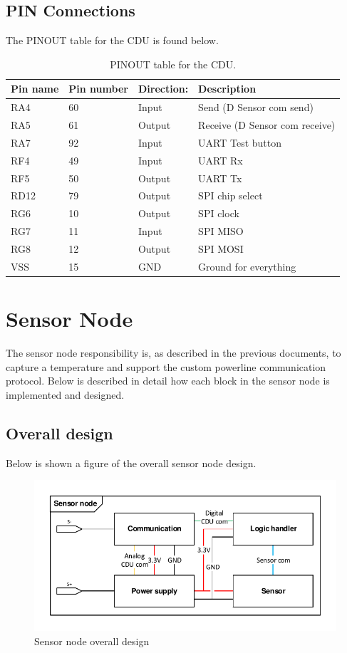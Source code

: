\subsection{PIN Connections}
The PINOUT table for the CDU is found below.
\begin{table}[H]
	\centering
    \begin{tabular}{|l|l|l|l|}
    \hline
    Pin name & Pin number & Direction: & Description \\ \hline
    RA4    & 60 & Input          & Send (D Sensor com send)            \\ \hline
    RA5    & 61 & Output          & Receive (D Sensor com receive)    \\ \hline
    RA7	   & 92 & Input			 & UART Test button   \\ \hline
    RF4		& 49 & Input		 & UART Rx \\ \hline
    RF5		& 50 & Output		 & UART Tx \\ \hline
    RD12	& 79 & Output			 & SPI chip select           \\ \hline
    RG6		& 10 & Output			 & SPI clock           \\ \hline
    RG7		& 11 & Input			& SPI MISO		\\ \hline
    RG8		& 12 & Output			& SPI MOSI		\\ \hline
    VSS		& 15 & GND				& Ground for everything \\ \hline
    \end{tabular}
    \caption{PINOUT table for the CDU.}
\end{table}


\section{Sensor Node}
The sensor node responsibility is, as described in the previous documents, to capture a temperature and support the custom powerline communication protocol. Below is described in detail how each block in the sensor node is implemented and designed.

\subsection{Overall design}
Below is shown a figure of the overall sensor node design.
\begin{figure}[H]
\centering
\includegraphics[width=.9\textwidth]{billeder/sn_overall_design}
\caption{Sensor node overall design}
\end{figure}

